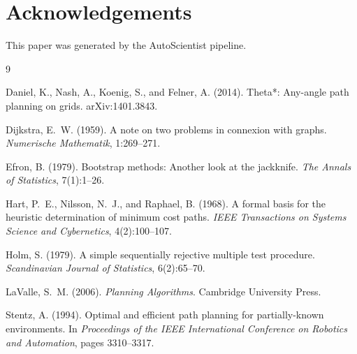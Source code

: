 \documentclass[11pt,a4paper]{article}
\begin{document}
\section*{Acknowledgements}
This paper was generated by the AutoScientist pipeline.


\begin{thebibliography}{9}

Daniel, K., Nash, A., Koenig, S., and Felner, A. (2014).
\newblock Theta*: Any-angle path planning on grids.
\newblock arXiv:1401.3843.

Dijkstra, E.~W. (1959).
\newblock A note on two problems in connexion with graphs.
\newblock \emph{Numerische Mathematik}, 1:269--271.

Efron, B. (1979).
\newblock Bootstrap methods: Another look at the jackknife.
\newblock \emph{The Annals of Statistics}, 7(1):1--26.

Hart, P.~E., Nilsson, N.~J., and Raphael, B. (1968).
\newblock A formal basis for the heuristic determination of minimum cost paths.
\newblock \emph{IEEE Transactions on Systems Science and Cybernetics},
  4(2):100--107.

Holm, S. (1979).
\newblock A simple sequentially rejective multiple test procedure.
\newblock \emph{Scandinavian Journal of Statistics}, 6(2):65--70.

LaValle, S.~M. (2006).
\newblock \emph{Planning Algorithms}.
\newblock Cambridge University Press.

Stentz, A. (1994).
\newblock Optimal and efficient path planning for partially-known environments.
\newblock In \emph{Proceedings of the IEEE International Conference on Robotics
  and Automation}, pages 3310--3317.

\end{thebibliography}
\end{document}
